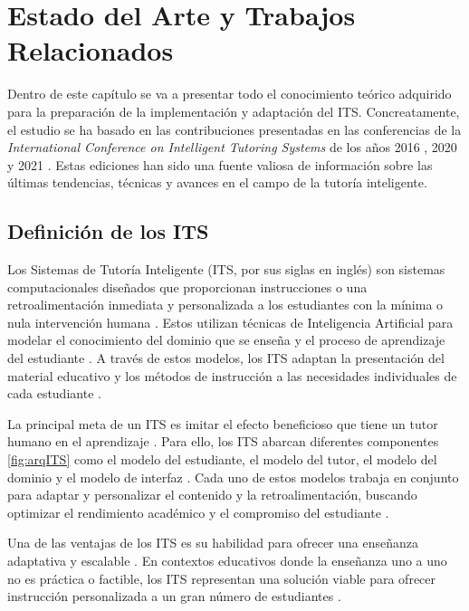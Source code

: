 \chapter{Estado del Arte y Trabajos Relacionados} \label{chap:stateoftheart}

Dentro de este capítulo se va a presentar todo el conocimiento teórico adquirido para la preparación de la implementación y adaptación del ITS. Concreatamente, el estudio se ha basado en las contribuciones presentadas en las conferencias de la \textit{International Conference on Intelligent Tutoring Systems} de los años 2016 \cite{ITS2016}, 2020 \cite{ITS2020} y 2021 \cite{ITS2021}. Estas ediciones han sido una fuente valiosa de información sobre las últimas tendencias, técnicas y avances en el campo de la tutoría inteligente. 

\section{Definición de los ITS}

Los Sistemas de Tutoría Inteligente (ITS, por sus siglas en inglés) son sistemas computacionales diseñados que proporcionan instrucciones o una retroalimentación inmediata y personalizada a los estudiantes con la mínima o nula intervención humana \cite{Woolf2009}. Estos utilizan técnicas de Inteligencia Artificial para modelar el conocimiento del dominio que se enseña y el proceso de aprendizaje del estudiante \cite{Aleven2016}. A través de estos modelos, los ITS adaptan la presentación del material educativo y los métodos de instrucción a las necesidades individuales de cada estudiante \cite{Nwana1990}.

La principal meta de un ITS es imitar el efecto beneficioso que tiene un tutor humano en el aprendizaje \cite{VanLehn2011}. Para ello, los ITS abarcan diferentes componentes \ref{fig:arqITS} como el modelo del estudiante, el modelo del tutor, el modelo del dominio y el modelo de interfaz \cite{Koedinger1997}. Cada uno de estos modelos trabaja en conjunto para adaptar y personalizar el contenido y la retroalimentación, buscando optimizar el rendimiento académico y el compromiso del estudiante \cite{Durlach2008}.

Una de las ventajas de los ITS es su habilidad para ofrecer una enseñanza adaptativa y escalable \cite{Murray2003}. En contextos educativos donde la enseñanza uno a uno no es práctica o factible, los ITS representan una solución viable para ofrecer instrucción personalizada a un gran número de estudiantes \cite{Graesser2009}.

